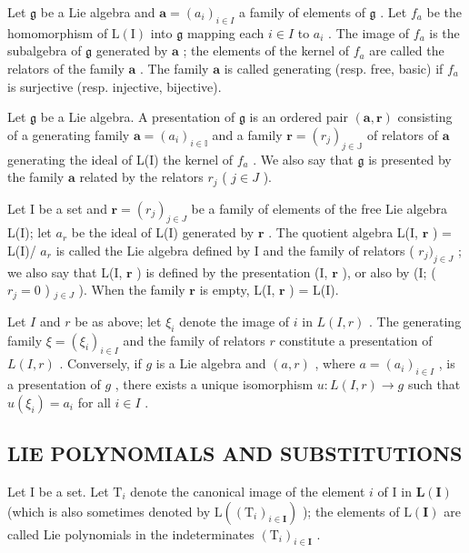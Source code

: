 Let \(\mathfrak{g}\) be a Lie algebra and \(\pmb{a} = (a_i)_{i\in I}\) a family of elements of \(\mathfrak{g}\) . Let \(f_{a}\) be the homomorphism of \(\mathrm{L(I)}\) into \(\mathfrak{g}\) mapping each \(i\in I\) to \(a_{i}\) . The image of \(f_{a}\) is the subalgebra of \(\mathfrak{g}\) generated by \(\pmb{a}\) ; the elements of the kernel of \(f_{a}\) are called the relators of the family \(\pmb{a}\) . The family \(\pmb{a}\) is called generating (resp. free, basic) if \(f_{a}\) is surjective (resp. injective, bijective).

Let \(\mathfrak{g}\) be a Lie algebra. A presentation of \(\mathfrak{g}\) is an ordered pair \((\boldsymbol{a},\boldsymbol{r})\) consisting of a generating family \(\boldsymbol{a} = (a_{i})_{i\in \mathbb{I}}\) and a family \(\boldsymbol{r} = (r_j)_{j\in \mathbb{J}}\) of relators of \(\boldsymbol{a}\) generating the ideal of L(I) the kernel of \(f_{a}\) . We also say that \(\mathfrak{g}\) is presented by the family \(\boldsymbol{a}\) related by the relators \(r_j\) ( \(j\in J\) ).

Let I be a set and \(\pmb{r} = (r_j)_{j \in J}\) be a family of elements of the free Lie algebra L(I); let \(a_r\) be the ideal of L(I) generated by \(\pmb{r}\) . The quotient algebra L(I, \(\pmb{r}\) ) = L(I)/ \(a_r\) is called the Lie algebra defined by I and the family of relators ( \(r_j)_{j \in J}\) ; we also say that L(I, \(\pmb{r}\) ) is defined by the presentation (I, \(\pmb{r}\) ), or also by (I; ( \(r_j = 0\) ) \(_{j \in J}\) ). When the family \(\pmb{r}\) is empty, L(I, \(\pmb{r}\) ) = L(I).

Let \(I\) and \(r\) be as above; let \(\xi_i\) denote the image of \(i\) in \(L(I, r)\) . The generating family \(\xi = (\xi_i)_{i \in I}\) and the family of relators \(r\) constitute a presentation of \(L(I, r)\) . Conversely, if \(g\) is a Lie algebra and \((a, r)\) , where \(a = (a_i)_{i \in I}\) , is a presentation of \(g\) , there exists a unique isomorphism \(u: L(I, r) \to g\) such that \(u(\xi_i) = a_i\) for all \(i \in I\) .

\subsection{LIE POLYNOMIALS AND SUBSTITUTIONS}

Let I be a set. Let \(\mathrm{T}_i\) denote the canonical image of the element \(i\) of I in \(\mathbf{L}(\mathbf{I})\) (which is also sometimes denoted by \(\mathrm{L}((\mathrm{T}_i)_{i\in \mathbf{I}})\) ); the elements of \(\mathrm{L}(\mathbf{I})\) are called Lie polynomials in the indeterminates \((\mathrm{T}_i)_{i\in \mathbf{I}}\) .

